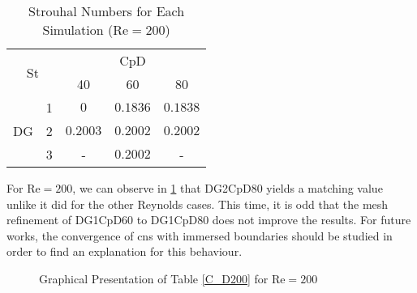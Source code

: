 \begin{table}[htp]
	\centering
	\def\arraystretch{1.5}
	\begin{tabular}{|c|c|c|c|c|}
		\hline
		\multicolumn{2}{|c|}{\multirow{2}{*}{St}} & \multicolumn{3}{c|}{CpD} \\ \cline{3-5} 
		\multicolumn{2}{|c|}{}                       & 40     & 60    & 80    \\ \hline
		\multirow{3}{*}{DG}            & 1           &    $0$    &    $0.1836$   &    $0.1838$    \\ \cline{2-5} 
		& 2           &     $0.2003$   &    $0.2002$   &     $0.2002$   \\ \cline{2-5} 
		& 3           &     -   &    $0.2002$   &    -    \\ \hline
	\end{tabular}
	\caption{Strouhal Numbers for Each Simulation ($\text{Re} = 200$)}	
	\label{Str200}
\end{table}
\newpage
For $\text{Re}=200$, we can observe in \cref{fig:C_D200} that DG2CpD80 yields a matching value unlike it did for the other Reynolds cases. This time, it is odd that the mesh refinement of DG1CpD60 to DG1CpD80 does not improve the results. For future works, the convergence of \gls{cns} with immersed boundaries should be studied in order to find an explanation for this behaviour.
\begin{figure}[htp]	
	\centering
	\caption{Graphical Presentation of Table \ref{C_D200} for $\text{Re} = 200$}
	\label{fig:C_D200}	
\end{figure}

